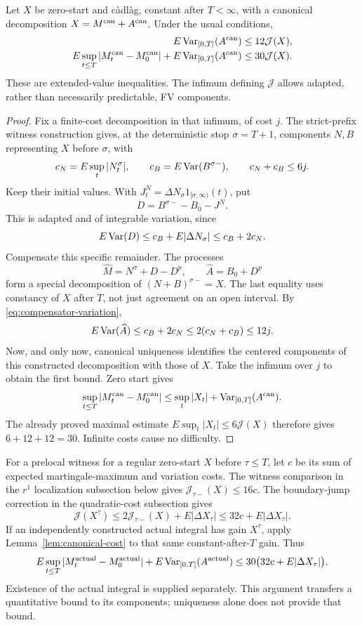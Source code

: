 \begin{lemma}
\label{lem:canonical-cost}
Let $X$ be zero-start and c\`adl\`ag, constant after $T<\infty$, with a
canonical decomposition $X=M^{\rm can}+A^{\rm can}$.
Under the usual conditions,
\[
 \begin{aligned}
 E\operatorname{Var}_{[0,T]}(A^{\rm can})&\leq12\mathcal J(X),\\
 E\sup_{t\leq T}|M^{\rm can}_t-M^{\rm can}_0|
       +E\operatorname{Var}_{[0,T]}(A^{\rm can})&\leq30\mathcal J(X).
 \end{aligned}
\]
These are extended-value inequalities. The infimum defining $\mathcal J$
allows adapted, rather than necessarily predictable, FV components.
\end{lemma}
\begin{proof}
Fix a finite-cost decomposition in that infimum, of cost $j$.
The strict-prefix witness construction gives, at the deterministic stop
$\sigma=T+1$, components $N,B$ representing $X$ before $\sigma$, with
\[
 c_N=E\sup_t|N^\sigma_t|,\qquad
 c_B=E\operatorname{Var}(B^{\sigma-}),\qquad c_N+c_B\leq6j.
\]
Keep their initial values. With $J^N_t=\Delta N_\sigma1_{[\sigma,\infty)}(t)$,
put
\[
 D=B^{\sigma-}-B_0-J^N.
\]
This is adapted and of integrable variation, since
\[
 E\operatorname{Var}(D)\leq c_B+E|\Delta N_\sigma|\leq c_B+2c_N.
\]
Compensate this specific remainder. The processes
\[
 \widehat M=N^\sigma+D-D^p,\qquad \widehat A=B_0+D^p
\]
form a special decomposition of $(N+B)^{\sigma-}=X$.
The last equality uses constancy of $X$ after $T$, not just agreement on
an open interval. By \eqref{eq:compensator-variation},
\[
 E\operatorname{Var}(\widehat A)\leq c_B+2c_N\leq2(c_N+c_B)\leq12j.
\]
Now, and only now, canonical uniqueness identifies the centered components
of this constructed decomposition with those of $X$.
Take the infimum over $j$ to obtain the first bound.
Zero start gives
\[
 \sup_{t\leq T}|M^{\rm can}_t-M^{\rm can}_0|
 \leq\sup_t|X_t|+\operatorname{Var}_{[0,T]}(A^{\rm can}).
\]
The already proved maximal estimate $E\sup_t|X_t|\leq6\mathcal J(X)$
therefore gives $6+12+12=30$. Infinite costs cause no difficulty.
\end{proof}

For a prelocal witness for a regular zero-start $X$ before $\tau\leq T$,
let $c$ be its sum of expected martingale-maximum and variation costs.
The witness comparison in the $r^1$ localization subsection below gives
$\mathcal J_{\tau-}(X)\leq16c$.
The boundary-jump correction in the quadratic-cost subsection gives
\[
 \mathcal J(X^\tau)\leq2\mathcal J_{\tau-}(X)+E|\Delta X_\tau|
 \leq32c+E|\Delta X_\tau|.
\]
If an independently constructed actual integral has gain $X^\tau$, apply
Lemma~\ref{lem:canonical-cost} to that same constant-after-$T$ gain. Thus
\begin{equation}\label{eq:actual-closed-cost}
 E\sup_{t\leq T}|M^{\rm actual}_t-M^{\rm actual}_0|
 +E\operatorname{Var}_{[0,T]}(A^{\rm actual})
 \leq30\bigl(32c+E|\Delta X_\tau|\bigr).
\end{equation}
Existence of the actual integral is supplied separately. This argument
transfers a quantitative bound to its components; uniqueness alone does not
provide that bound.
